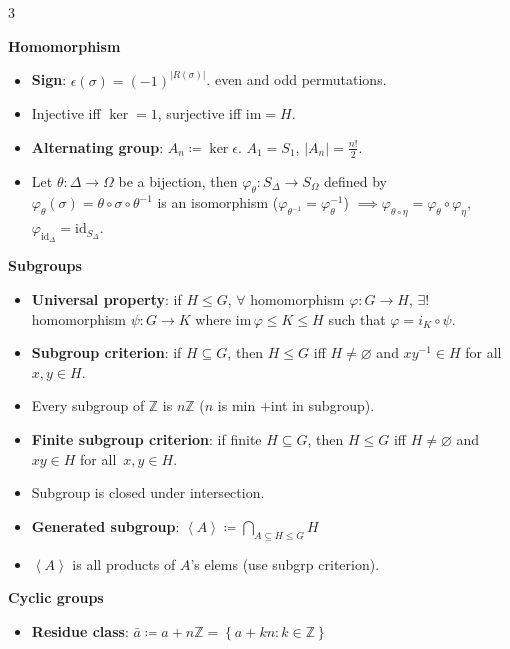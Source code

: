 \documentclass[10pt]{article}
\newcommand{\Z}{\mathbb{Z}} %
\newcommand{\abs}[1]{\left\lvert#1\right\rvert} %
\begin{document}
\begin{multicols*}{3}
\begin{itemize}
        \end{itemize}
        \textbf{Homomorphism}
        \begin{itemize}
            \item \textbf{Sign}: $\epsilon\left(\sigma\right) = \left(-1\right)^{\abs{R\left(\sigma\right)}}$. even and odd permutations.
            \item Injective iff $\ker = 1$, surjective iff $\mathrm{im} = H$.
            \item \textbf{Alternating group}: $A_n \coloneqq \ker{\epsilon}$. $A_1 = S_1$, $\abs{A_n} = \frac{n!}{2}$.
            \item Let $\theta \colon \Delta \to \Omega$ be a bijection, then $\varphi_{\theta} \colon S_{\Delta} \to S_{\Omega}$ defined by $\varphi_{\theta}\left(\sigma\right) = \theta \circ \sigma \circ \theta^{-1}$ is an isomorphism ($\varphi_{\theta^{-1}} = \varphi_{\theta}^{-1}$) $\implies \varphi_{\theta \circ \eta} = \varphi_{\theta} \circ \varphi_{\eta}$, $\varphi_{\mathrm{id}_{\Delta}} = \mathrm{id}_{S_{\Delta}}$.
        \end{itemize}
        \textbf{Subgroups}
        \begin{itemize}
            \item \textbf{Universal property}: if $H \leq G$, $\forall$ homomorphism $\varphi \colon G \to H$, $\exists!$ homomorphism $\psi \colon G \to K$ where $\mathrm{im}\,{\varphi} \leq K \leq H$ such that $\varphi = i_{K} \circ \psi$.
            \item \textbf{Subgroup criterion}: if $H \subseteq G$, then $H \leq G$ iff $H \neq \varnothing$ and $xy^{-1} \in H$ for all~$x, y \in H$.
            \item Every subgroup of $\Z$ is $n\Z$ ($n$ is min $+$int in subgroup).
            \item \textbf{Finite subgroup criterion}: if finite $H \subseteq G$, then $H \leq G$ iff $H \neq \varnothing$ and $xy \in H$ for all~$x, y \in H$.
            \item Subgroup is closed under intersection.
            \item \textbf{Generated subgroup}: $\left\langle A \right\rangle \coloneqq \bigcap_{A \subseteq H \leq G}H$
            \item $\left\langle A \right\rangle$ is all products of $A$'s elems (use subgrp criterion).
        \end{itemize}
        \textbf{Cyclic groups}
        \begin{itemize}
            \item \textbf{Residue class}: $\bar{a} \coloneqq a + n\Z = \left\{a + kn \colon k \in \Z\right\}$

\end{itemize}
\end{multicols*}
\end{document}
